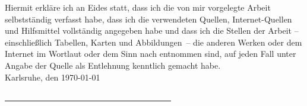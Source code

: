 \thispagestyle{empty}
\vspace*{13.5cm}
Hiermit erkläre ich an Eides statt, dass ich die von mir vorgelegte Arbeit
selbstständig verfasst habe, dass ich die verwendeten Quellen,
Internet-Quellen und Hilfsmittel vollständig angegeben habe und dass ich die
Stellen der Arbeit -- einschließlich Tabellen, Karten und Abbildungen~-- die
anderen Werken oder dem Internet im Wortlaut oder dem Sinn nach entnommen
sind, auf jeden Fall unter Angabe der Quelle als Entlehnung kenntlich gemacht
habe.\\

Karlsruhe, den \today\\
\medskip
\medskip

\underline{~~~~~~~~~~~~~~~~~~~~~~~~~~~~~~~~~~~~~~~~}\\
\myname
